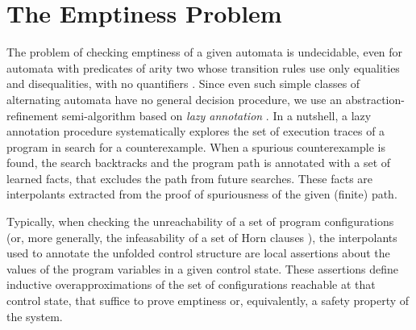 \documentclass{llncs}
\begin{document}
\section{The Emptiness Problem}

The problem of checking emptiness of a given automata is undecidable,
even for automata with predicates of arity two whose transition rules
use only equalities and disequalities, with no quantifiers
\cite{Farzan15}. Since even such simple classes of alternating
automata have no general decision procedure, we use an
abstraction-refinement semi-algorithm based on \emph{lazy annotation}
\cite{McMillan06,McMillan14}. In a nutshell, a lazy annotation
procedure systematically explores the set of execution traces of a
program in search for a counterexample. When a spurious counterexample
is found, the search backtracks and the program path is annotated with
a set of learned facts, that excludes the path from future
searches. These facts are interpolants extracted from the proof of
spuriousness of the given (finite) path.

Typically, when checking the unreachability of a set of program
configurations (or, more generally, the infeasability of a set of Horn
clauses \cite{BjornerGurfinkelMcMillanRybalchenko15}), the
interpolants used to annotate the unfolded control structure are local
assertions about the values of the program variables in a given
control state. These assertions define inductive overapproximations of
the set of configurations reachable at that control state, that
suffice to prove emptiness or, equivalently, a safety property of the
system.
\end{document}

